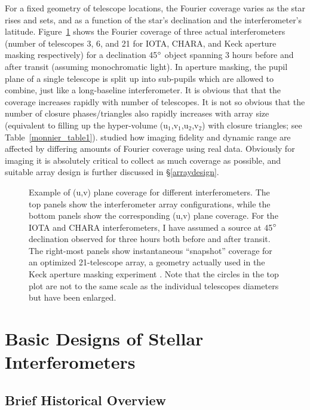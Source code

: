 \documentclass[12pt]{article}
\def\arcdegg{\hbox{$^\circ$}}
\begin{document}
For a fixed geometry of telescope locations, the Fourier coverage
varies as the star rises and sets, and as a function of the star's
declination and the interferometer's latitude.
Figure~\ref{figuvplane} shows the Fourier coverage of three actual
interferometers (number of telescopes 3, 6, and 21 for IOTA, CHARA,
and Keck aperture masking respectively) for a declination 45$\arcdegg$
object spanning 3 hours before and after transit (assuming
monochromatic light).  In aperture masking, the pupil plane of a
single telescope is split up into sub-pupils which are allowed to
combine, just like a long-baseline interferometer.  It is obvious that
that the coverage increases rapidly with number of telescopes.  It is
not so obvious that the number of closure phases/triangles also
rapidly increases with array size (equivalent to filling up the
hyper-volume (u$_1$,v$_1$,u$_2$,v$_2$) with closure triangles; see
Table~\ref{monnier_table1}). \citet{tuthillchara2000} studied how
imaging fidelity and dynamic range are affected by differing amounts
of Fourier coverage using real data.  Obviously for imaging it is
absolutely critical to collect as much coverage as possible, and
suitable array design is further discussed in \S\ref{arraydesign}.

\begin{figure}
\begin{center}
\caption{Example of (u,v) plane coverage for different
interferometers.  The top panels 
show the interferometer array configurations, while the bottom panels
show the corresponding (u,v) plane coverage.   For the IOTA and CHARA
interferometers, I have assumed a source at 
45$\arcdegg$ declination observed for three hours both 
before and after transit. The right-most panels show instantaneous
``snapshot'' coverage for an optimized 21-telescope array, a geometry
actually used in the Keck aperture masking experiment 
\citep{tuthill2000}.
Note that the circles in the top plot are not to the same scale as the
individual telescopes diameters but have been enlarged.
\label{figuvplane}}
\end{center}
\end{figure}

\section{Basic Designs of Stellar Interferometers}
\label{basicdesigns}
\subsection{Brief Historical Overview}
\label{history}
\end{document}
